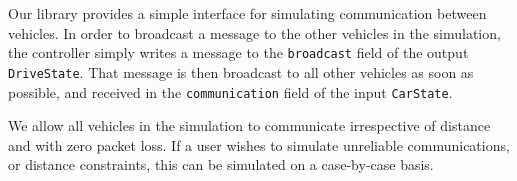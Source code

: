 Our library provides a simple interface for simulating communication between vehicles.
In order to broadcast a message to the other vehicles in the simulation, the controller simply writes a message to the \texttt{broadcast} field of the output \texttt{DriveState}.
That message is then broadcast to all other vehicles as soon as possible, and received in the \texttt{communication} field of the input \texttt{CarState}.

We allow all vehicles in the simulation to communicate irrespective of distance and with zero packet loss.
If a user wishes to simulate unreliable communications, or distance constraints, this can be simulated on a case-by-case basis.
